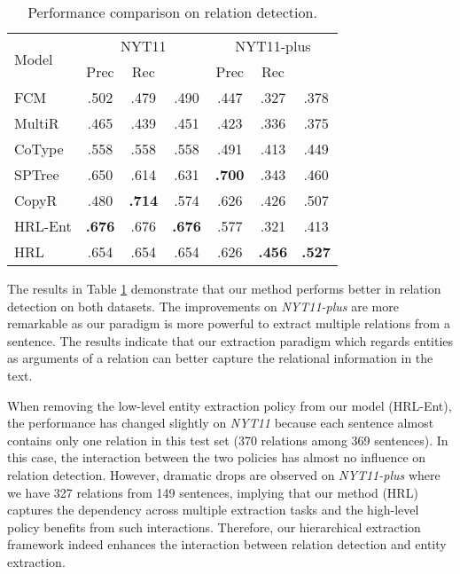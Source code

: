 \documentclass[letterpaper]{article} \usepackage{aaai19}  \usepackage{times}  \usepackage{helvet}  \usepackage{courier}  \usepackage{url}  \usepackage{graphicx}  \frenchspacing  \setlength{\pdfpagewidth}{8.5in}  \setlength{\pdfpageheight}{11in}  \usepackage{amsfonts}
\theoremstyle{definition}
\begin{document}
\begin{table}[!htb]
\centering
    \begin{tabular}{lcccccc}
    \toprule
        \multirow{2}{*}{Model} & \multicolumn{3}{c}{NYT11} & \multicolumn{3}{c}{NYT11-plus}\\
         & Prec & Rec &  & Prec & Rec &  \\
    \midrule
        FCM    & .502 & .479 & .490 & .447 & .327 & .378 \\
        MultiR & .465 & .439 & .451 & .423 & .336 & .375 \\
        CoType & .558 & .558 & .558 & .491 & .413 & .449 \\
        SPTree & .650 & .614 & .631 & \textbf{.700} & .343 & .460 \\
        CopyR & .480 & \textbf{.714} & .574 & .626 & .426 & .507\\
    \midrule
        HRL-Ent  & \textbf{.676} & .676 & \textbf{.676} & .577 & .321 & .413 \\
        HRL    & .654 & .654 & .654 & .626 & \textbf{.456} & \textbf{.527} \\
    \bottomrule
    \end{tabular}
    \caption{Performance comparison on relation detection.} \label{relation}
\end{table} 

The results in Table \ref{relation} demonstrate that our method performs better in relation detection on both datasets. The improvements on {\it NYT11-plus} are more remarkable as our paradigm is more powerful to extract multiple relations from a sentence. 
The results indicate that our extraction paradigm which regards entities as arguments of a relation can better capture the relational information in the text.

When removing the low-level entity extraction policy from our model (HRL-Ent), the performance has changed slightly on \textit{NYT11} because each sentence almost contains only one relation in this test set (370 relations among 369 sentences). 
In this case, the interaction between the two policies has almost no influence on relation detection. However, dramatic drops are observed on \textit{NYT11-plus} where we have 327 relations from 149 sentences, implying that our method (HRL) captures the dependency across multiple extraction tasks and the high-level policy benefits from such interactions. Therefore, our hierarchical extraction framework indeed enhances the interaction between relation detection and entity extraction.
\end{document}
